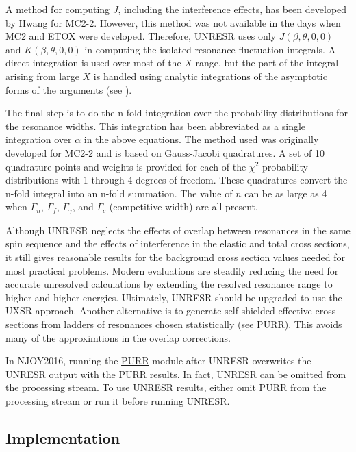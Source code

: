A method for computing $J$, including the interference effects, has
been developed by Hwang for MC2-2\cite{MC22}.  However,
this method was not available in the days when MC2 and ETOX
were developed.  Therefore, UNRESR uses only
$J(\beta,\theta,0,0)$ and $K(\beta,\theta,0,0)$
in computing the isolated-resonance fluctuation integrals.
A direct integration is used over most of the $X$ range, but
the part of the integral arising from large $X$ is handled
using analytic integrations of the asymptotic forms of
the arguments (see ).

The final step is to do the n-fold integration over the probability
distributions for the resonance widths.  This integration has
been abbreviated as a single integration over $\alpha$ in the
above equations.  The method used was originally developed for
MC2-2 and is based on Gauss-Jacobi quadratures.
 A set of 10
quadrature points and weights is provided for each of the
$\chi^2$ probability distributions with 1 through 4 degrees of
freedom.  These quadratures convert the n-fold integral into an
n-fold summation.  The value of $n$ can be as large as 4 when
$\Gamma_n$, $\Gamma_f$, $\Gamma_\gamma$, and $\Gamma_c$
(competitive width) are all present.

Although UNRESR neglects the effects of overlap between resonances in
the same spin sequence and the effects of interference in the elastic
and total cross sections, it still gives reasonable results for the
background cross section values needed for most practical problems.
Modern evaluations are steadily reducing the need for accurate
unresolved calculations by extending the resolved resonance range to
higher and higher energies.  Ultimately, UNRESR should be upgraded to
use the UXSR approach.  Another alternative is to generate
self-shielded effective cross sections from ladders of resonances
chosen statistically (see \hyperlink{sPURRhy}{PURR}).  This
avoids many of the approximtions in the overlap corrections.

In NJOY2016, running the \hyperlink{sPURRhy}{PURR} module
after UNRESR overwrites the UNRESR output with the
\hyperlink{sPURRhy}{PURR} results.  In fact, UNRESR can be
omitted from the processing stream.  To use UNRESR results,
either omit \hyperlink{sPURRhy}{PURR} from the processing
stream or run it before running UNRESR.

\subsection{Implementation}
\label{ssUNRESR_implementation}


